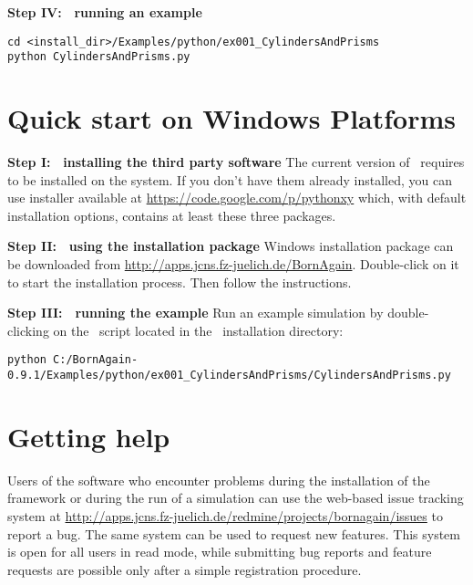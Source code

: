 \noindent
{\bf Step IV: $~$ running an example}
\begin{lstlisting}[language=shell, style=commandline]
cd <install_dir>/Examples/python/ex001_CylindersAndPrisms
python CylindersAndPrisms.py
\end{lstlisting}



\section{Quick start on Windows Platforms}

\noindent
{\bf Step I: $~$ installing the third party software} \newline
The current version of \BornAgain\ requires  
to be installed on the system. If you don't have them already installed,
you can use  installer available 
at \url{https://code.google.com/p/pythonxy} which, with default installation options, contains at least these three packages.
\vspace*{2mm}

\noindent
{\bf Step II: $~$ using the installation package } \newline
Windows installation package can be downloaded from \url{http://apps.jcns.fz-juelich.de/BornAgain}.
Double-click on it to start the installation process. Then follow the instructions.
\vspace*{2mm}

\noindent
{\bf Step III: $~$ running the example} \newline
Run an example simulation by double-clicking on the \Python\ script located in the \BornAgain\ installation directory:
\begin{lstlisting}[language=shell, style=commandline]
python C:/BornAgain-0.9.1/Examples/python/ex001_CylindersAndPrisms/CylindersAndPrisms.py
\end{lstlisting}


\section{Getting help}
Users of the software who encounter problems during the installation
of the framework or during the run of a simulation can use the web-based issue tracking system
at
\url{http://apps.jcns.fz-juelich.de/redmine/projects/bornagain/issues}
to report a bug. The same system can be used to request new features.
This system is open for all users in read mode, while 
submitting bug reports and feature requests are possible only after a simple registration
procedure.






